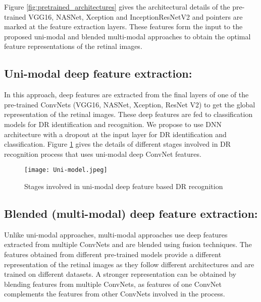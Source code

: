 \documentclass[electronics,article,accept ,moreauthors,pdftex]{mdpi}
\begin{document}
Figure \ref{fig:pretrained_architectures} gives the architectural details of the pre-trained VGG16, NASNet, Xception and InceptionResNetV2 and pointers are marked at the feature extraction layers. These features form the input to the  proposed uni-modal and blended multi-modal approaches to obtain the optimal feature representations of the retinal images. 

\subsection{Uni-modal deep feature extraction: }
In this approach, deep features are extracted from the final layers of one of the pre-trained ConvNets (VGG16, NASNet, Xception, ResNet V2) to get the global representation of the retinal images. These deep features are fed to classification models for DR identification and recognition. 
We propose to use DNN architecture with a dropout at the input layer for DR identification and classification. Figure \ref{fig:Unimodal} gives the details of different stages involved in DR recognition process that uses uni-modal deep ConvNet features.
\begin{figure}[H]
    \center
    \texttt{[image: Uni-model.jpeg]}
    \caption{Stages involved in uni-modal deep feature based DR recognition}
    \label{fig:Unimodal}
\end{figure}

\subsection{Blended (multi-modal) deep feature extraction:}

Unlike uni-modal approaches,  multi-modal approaches use deep features extracted from multiple ConvNets and are blended using fusion techniques.
The features obtained from different pre-trained models provide a different representation of the retinal images as    they follow different architectures and are trained on different datasets. A stronger representation can be obtained by blending features from multiple ConvNets, as features of one ConvNet complements the features from other ConvNets involved in the process.
\end{document}
